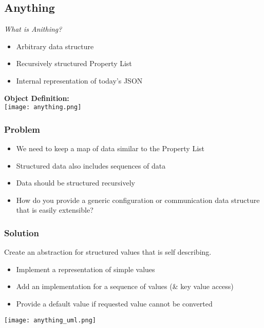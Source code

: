 \subsection{Anything}
\textit{What is Anithing?}
\begin{itemize}[topsep=0pt]
    \itemsep -0.4em
    \item Arbitrary data structure
    \item Recursively structured Property List
    \item Internal representation of today's JSON
\end{itemize}
\textbf{Object Definition:}\\
\texttt{[image: anything.png]}
\subsubsection{Problem}
\begin{itemize}[topsep=0pt]
    \itemsep -0.4em
    \item We need to keep a map of data similar to the Property List
    \item Structured data also includes sequences of data
    \item Data should be structured recursively
    \item How do you provide a generic configuration or communication data structure that is easily extensible?
\end{itemize}
\subsubsection{Solution}
Create an abstraction for structured values that is self describing.
\begin{itemize}[topsep=0pt]
    \itemsep -0.4em
    \item Implement a representation of simple values
    \item Add an implementation for a sequence of values (\& key value access)
    \item Provide a default value if requested value cannot be converted
\end{itemize}
\texttt{[image: anything\_uml.png]}
